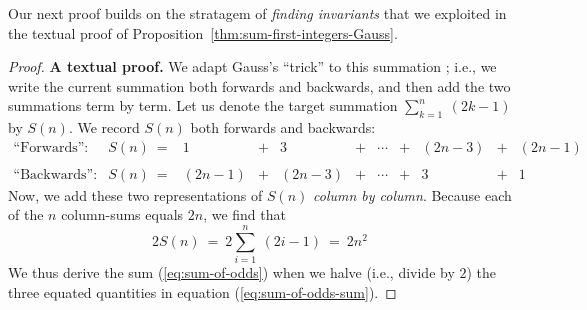 \medskip

Our next proof builds on the stratagem of {\em finding invariants} that we exploited in the textual proof of Proposition~\ref{thm:sum-first-integers-Gauss}.

\begin{proof}
{\bf A textual proof.}
We adapt Gauss's ``trick'' to this summation ; i.e., we write the current summation both forwards and backwards, and then add the two summations term by term.  Let us denote the target summation $\sum_{k=1}^n \ (2k-1)$ by $S(n)$.  We record $S(n)$ both forwards and backwards:
\begin{equation}
\label{eq:add-odds}
\begin{array}{llccccccccc}
\mbox{``Forwards'':} &
S(n) \ = 
& 1 & + & 3 & + & \cdots & + & (2n-3) & + & (2n-1) \\
 & & & & & & & & & &  \\
\mbox{``Backwards'':} &
S(n) \ =
& (2n-1) & + & (2n-3) & + & \cdots & + & 3 & + & 1
\end{array}
\end{equation}
Now, we add these two representations of $S(n)$ {\em column by column}.  Because each of the $n$ column-sums equals $2n$, we find that
\begin{equation}
\label{eq:sum-of-odds-sum}
2 S(n) \ = \ 2 \sum_{i=1}^n \ (2i-1) \ = \ 2n^2
\end{equation}
We thus derive the sum (\ref{eq:sum-of-odds}) when we halve (i.e., divide by $2$) the three
equated quantities in equation (\ref{eq:sum-of-odds-sum}).
\end{proof}

\medskip

